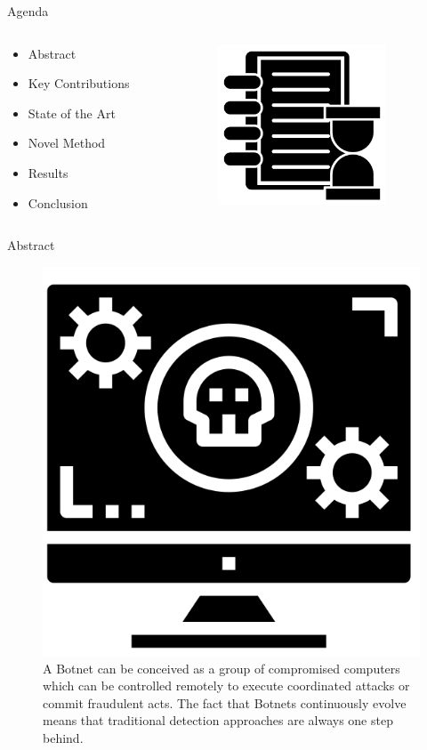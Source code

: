 \documentclass[pdf]{beamer}
\begin{document}
\begin{frame}[fragile]{Agenda}
\begin{minipage}[0.2\textheight]{\textwidth}
\begin{columns}[T]
\begin{column}{0.5\textwidth}
\begin{itemize}
\item Abstract
\item Key Contributions
\item State of the Art
\item Novel Method
\item Results
\item Conclusion
\end{itemize}
\end{column}
\begin{column}{0.5\textwidth}
\includegraphics[width=5cm]{Images/agenda.png}
\end{column}
\end{columns}
\end{minipage}
\end{frame}




\begin{frame}[fragile]{Abstract}
\begin{figure}
\includegraphics[width=0.3\linewidth,keepaspectratio]{Images/botnet.png}
\caption{A Botnet can be conceived as a group of compromised computers which can be controlled remotely to execute coordinated  attacks  or  commit  fraudulent  acts.  The  fact  that Botnets     continuously   evolve   means   that   traditional detection  approaches  are  always  one  step  behind. }
\end{figure}
\end{frame}
\end{document}
